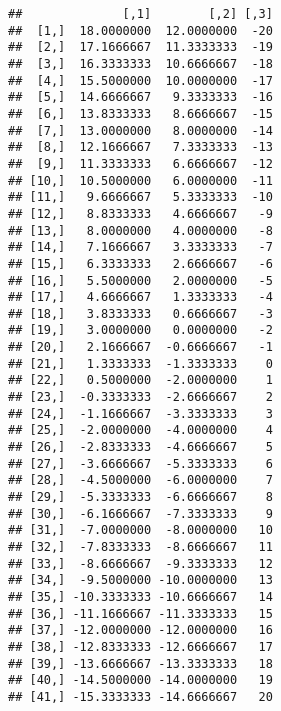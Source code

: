 \documentclass[
]{article}
\begin{document}
\begin{verbatim}
##              [,1]        [,2] [,3]
##  [1,]  18.0000000  12.0000000  -20
##  [2,]  17.1666667  11.3333333  -19
##  [3,]  16.3333333  10.6666667  -18
##  [4,]  15.5000000  10.0000000  -17
##  [5,]  14.6666667   9.3333333  -16
##  [6,]  13.8333333   8.6666667  -15
##  [7,]  13.0000000   8.0000000  -14
##  [8,]  12.1666667   7.3333333  -13
##  [9,]  11.3333333   6.6666667  -12
## [10,]  10.5000000   6.0000000  -11
## [11,]   9.6666667   5.3333333  -10
## [12,]   8.8333333   4.6666667   -9
## [13,]   8.0000000   4.0000000   -8
## [14,]   7.1666667   3.3333333   -7
## [15,]   6.3333333   2.6666667   -6
## [16,]   5.5000000   2.0000000   -5
## [17,]   4.6666667   1.3333333   -4
## [18,]   3.8333333   0.6666667   -3
## [19,]   3.0000000   0.0000000   -2
## [20,]   2.1666667  -0.6666667   -1
## [21,]   1.3333333  -1.3333333    0
## [22,]   0.5000000  -2.0000000    1
## [23,]  -0.3333333  -2.6666667    2
## [24,]  -1.1666667  -3.3333333    3
## [25,]  -2.0000000  -4.0000000    4
## [26,]  -2.8333333  -4.6666667    5
## [27,]  -3.6666667  -5.3333333    6
## [28,]  -4.5000000  -6.0000000    7
## [29,]  -5.3333333  -6.6666667    8
## [30,]  -6.1666667  -7.3333333    9
## [31,]  -7.0000000  -8.0000000   10
## [32,]  -7.8333333  -8.6666667   11
## [33,]  -8.6666667  -9.3333333   12
## [34,]  -9.5000000 -10.0000000   13
## [35,] -10.3333333 -10.6666667   14
## [36,] -11.1666667 -11.3333333   15
## [37,] -12.0000000 -12.0000000   16
## [38,] -12.8333333 -12.6666667   17
## [39,] -13.6666667 -13.3333333   18
## [40,] -14.5000000 -14.0000000   19
## [41,] -15.3333333 -14.6666667   20
\end{verbatim}
\end{document}
